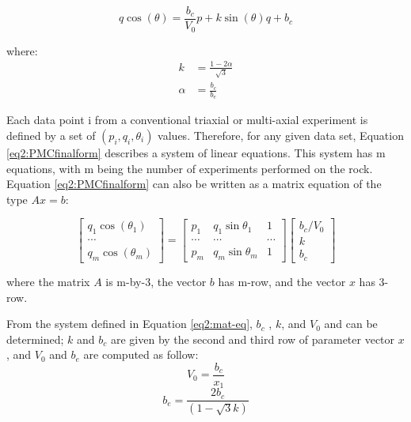 \begin{equation}\label{eq2:PMCfinalform}
    q\cos(\theta) = \frac{b_c}{V_0}p+k\sin(\theta)q+b_c
\end{equation}

where:
\begin{align}
    k &= \frac{1-2\alpha }{\sqrt{3}}\\
    \alpha &= \frac{b_c}{b_e}
\end{align}

Each data point i from a conventional triaxial or multi-axial experiment is defined by a set of $(p_i,q_i,\theta_i)$ values. Therefore, for any given data set, Equation \ref{eq2:PMCfinalform} describes a system of linear equations. This system has m equations, with m being the number of experiments performed on the rock. Equation \ref{eq2:PMCfinalform} can also be written as a matrix equation of the type $Ax=b$:

\begin{equation}\label{eq2:mat-eq}
    \left[\begin{array}{c}
    {q_{1} \cos \left(\theta_{1}\right)} \\
    {\cdots} \\
    {q_{m} \cos \left(\theta_{m}\right)}
    \end{array}\right]=\left[\begin{array}{ccc}
    {p_{1}} & {q_{1} \sin \theta_{1}} & {1} \\
    {\cdots} & {\cdots} & {\cdots} \\
    {p_{m}} & {q_{m} \sin \theta_{m}} & {1}
    \end{array}\right]\left[\begin{array}{c}
    {b_{c} / V_{0}} \\
    {k} \\
    {b_{c}}
    \end{array}\right]
\end{equation}

where the matrix $A$ is m-by-3, the vector $b$ has m-row, and the vector $x$ has 3-row. 

From the system defined in Equation \ref{eq2:mat-eq}, $b_c$ , $k$, and $V_0$  and can be determined; $k$ and $b_c$  are given by the second and third row of parameter vector $x$, and $V_0$ and $b_e$ are computed as follow: 
\begin{equation}\label{eq2:pmc_vo}
    V_0 = \frac{b_c}{x_1}
\end{equation}
\begin{equation}\label{eq2:pmc_be}
    b_e = \frac{2b_c}{(1-\sqrt{3}k)} 
\end{equation}

